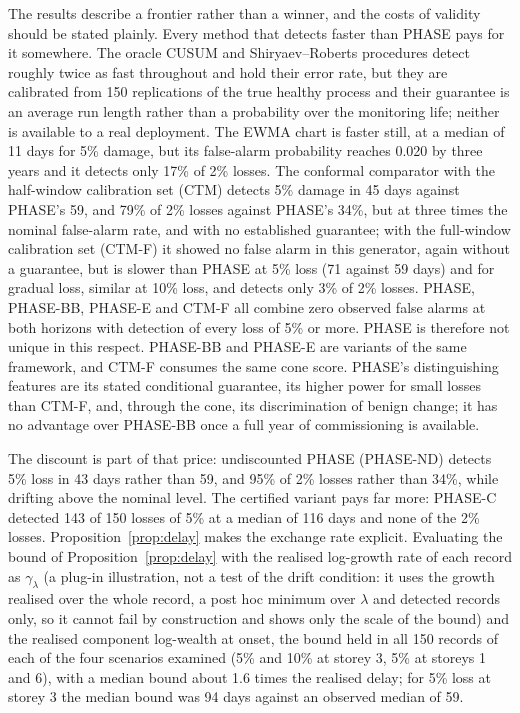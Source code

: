 \documentclass[12pt,a4paper]{article}
\newcommand{\rev}[1]{#1}
\newenvironment{revblock}{}{}
\newcommand{\rev}[1]{{\color{revcol}#1}}
\newenvironment{revblock}{\begingroup\color{revcol}}{\endgroup}
\newcommand{\rtwo}[1]{#1}
\newcommand{\rtwo}[1]{{\color{revcolb}#1}}
\begin{document}
The results describe a frontier rather than a winner, and the costs of validity should be stated plainly. Every method that detects faster than PHASE pays for it somewhere. The oracle CUSUM and Shiryaev--Roberts procedures detect roughly twice as fast throughout and hold their error rate, but they are calibrated from 150 replications of the true healthy process and their guarantee is an average run length rather than a probability over the monitoring life; neither is available to a real deployment. The EWMA chart is faster still, at a median of 11 days for 5\% damage, but its false-alarm probability reaches 0.020 by three years and it detects only 17\% of 2\% losses. \rtwo{The conformal comparator with the half-window calibration set (CTM) detects 5\% damage in 45 days against PHASE's 59, and 79\% of 2\% losses against PHASE's 34\%, but at three times the nominal false-alarm rate, and with no established guarantee; with the full-window calibration set (CTM-F) it showed no false alarm in this generator, again without a guarantee, but is slower than PHASE at 5\% loss (71 against 59 days) and for gradual loss, similar at 10\% loss, and detects only 3\% of 2\% losses.} \rev{PHASE, PHASE-BB, PHASE-E and CTM-F all combine zero observed false alarms at both horizons with detection of every loss of 5\% or more. PHASE is therefore not unique in this respect. PHASE-BB and PHASE-E are variants of the same framework, and CTM-F consumes the same cone score. PHASE's distinguishing features are its stated conditional guarantee, its higher power for small losses than CTM-F, and, through the cone, its discrimination of benign change; it has no advantage over PHASE-BB once a full year of commissioning is available.}

The discount is part of that price: undiscounted PHASE (PHASE-ND) detects 5\% loss in 43 days rather than 59, and 95\% of 2\% losses rather than 34\%, while drifting above the nominal level. The certified variant pays far more: PHASE-C detected 143 of 150 losses of 5\% at a median of 116 days and none of the 2\% losses. Proposition~\ref{prop:delay} makes the exchange rate explicit. \begin{revblock}Evaluating the bound of Proposition~\ref{prop:delay} with the realised log-growth rate of each record as $\gamma_\lambda$ (a plug-in illustration, not a test of the drift condition: it uses the growth realised over the whole record, a post hoc minimum over $\lambda$ and detected records only, so it cannot fail by construction and shows only the scale of the bound) and the realised component log-wealth at onset, the bound held in all 150 records of each of the four scenarios examined (5\% and 10\% at storey 3, 5\% at storeys 1 and 6), with a median bound about 1.6 times the realised delay; for 5\% loss at storey 3 the median bound was 94 days against an observed median of 59.\end{revblock}
\end{document}
